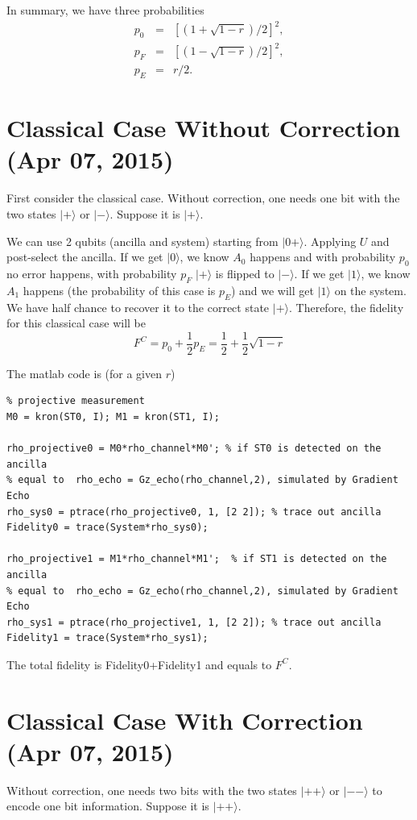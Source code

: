 \documentclass[prl,onecolumn]{revtex4-1}
\newcommand{\ket}[1]{|#1\rangle}
\newcommand{\be}{\begin{equation}}
\newcommand{\ee}{\end{equation}}
\newcommand{\bea}{\begin{eqnarray}}
\newcommand{\eea}{\end{eqnarray}}
\begin{document}
In summary, we have three probabilities 
\bea
p_0 &=& [(1+\sqrt{1-r})/2]^2, \nonumber \\ 
p_F &=& [(1-\sqrt{1-r})/2]^2, \nonumber \\
p_E &=& r/2.
\eea

\section{Classical Case Without Correction (Apr 07, 2015)}
First consider the classical case. Without correction, one needs one bit with the two states $\ket{+}$ or $\ket{-}$. Suppose it is $\ket{+}$.

We can use 2 qubits (ancilla and system) starting from $\ket{0+}$. Applying $U$ and post-select the ancilla. If we get $\ket{0}$, we know $A_0$ happens and with probability $p_0$ no error happens, with probability $p_F$ $\ket{+}$ is flipped to $\ket{-}$. If we get $\ket{1}$, we know $A_1$ happens (the probability of this case is $p_E$) and we will get $\ket{1}$ on the system. We have half chance to recover it to the correct state $\ket{+}$. Therefore, the fidelity for this classical case will be 
\be
F^C = p_0+\frac{1}{2}p_E = \frac{1}{2}+\frac{1}{2}\sqrt{1-r}
\ee

The matlab code is (for a given $r$)
\begin{lstlisting}
% projective measurement
M0 = kron(ST0, I); M1 = kron(ST1, I);

rho_projective0 = M0*rho_channel*M0'; % if ST0 is detected on the ancilla
% equal to  rho_echo = Gz_echo(rho_channel,2), simulated by Gradient Echo
rho_sys0 = ptrace(rho_projective0, 1, [2 2]); % trace out ancilla
Fidelity0 = trace(System*rho_sys0);

rho_projective1 = M1*rho_channel*M1';  % if ST1 is detected on the ancilla
% equal to  rho_echo = Gz_echo(rho_channel,2), simulated by Gradient Echo
rho_sys1 = ptrace(rho_projective1, 1, [2 2]); % trace out ancilla
Fidelity1 = trace(System*rho_sys1); 
\end{lstlisting}

The total fidelity is Fidelity0+Fidelity1 and equals to $F^C$.

\section{Classical Case With Correction (Apr 07, 2015)}
Without correction, one needs two bits with the two states $\ket{++}$ or $\ket{--}$ to encode one bit information. Suppose it is $\ket{++}$.
\end{document}
